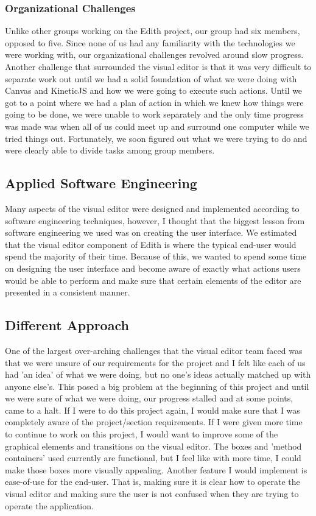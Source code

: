 \documentclass[a4paper]{article}
\begin{document}
\subsubsection{Organizational Challenges}

Unlike other groups working on the Edith project, our group had six members, opposed to five. Since none of us had any familiarity with the technologies we were working with, our organizational challenges revolved around slow progress. Another challenge that surrounded the visual editor is that it was very difficult to separate work out until we had a solid foundation of what we were doing with Canvas and KineticJS and how we were going to execute such actions. Until we got to a point where we had a plan of action in which we knew how things were going to be done, we were unable to work separately and the only time progress was made was when all of us could meet up and surround one computer while we tried things out. Fortunately, we soon figured out what we were trying to do and were clearly able to divide tasks among group members.

\subsection{Applied Software Engineering}

Many aspects of the visual editor were designed and implemented according to software engineering techniques, however, I thought that the biggest lesson from software engineering we used was on creating the user interface. We estimated that the visual editor component of Edith is where the typical end-user would spend the majority of their time. Because of this, we wanted to spend some time on designing the user interface and become aware of exactly what actions users would be able to perform and make sure that certain elements of the editor are presented in a consistent manner.

\subsection{Different Approach}

One of the largest over-arching challenges that the visual editor team faced was that we were unsure of our requirements for the project and I felt like each of us had 'an idea' of what we were doing, but no one's ideas actually matched up with anyone else's. This posed a big problem at the beginning of this project and until we were sure of what we were doing, our progress stalled and at some points, came to a halt. If I were to do this project again, I would make sure that I was completely aware of the project/section requirements. If I were given more time to continue to work on this project, I would want to improve some of the graphical elements and transitions on the visual editor. The boxes and 'method containers' used currently are functional, but I feel like with more time, I could make those boxes more visually appealing. Another feature I would implement is ease-of-use for the end-user. That is, making sure it is clear how to operate the visual editor and making sure the user is not confused when they are trying to operate the application.
\end{document}
